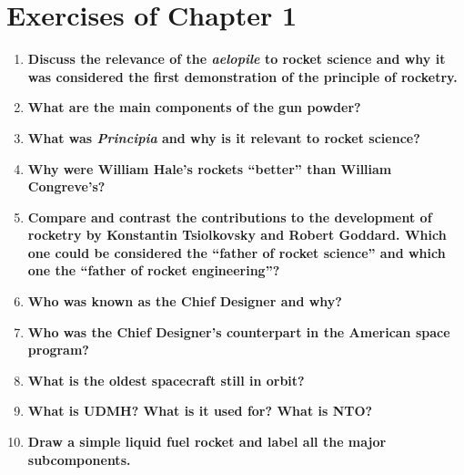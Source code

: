 \section{Exercises of Chapter 1}

\begin{enumerate}
	\item {\bf Discuss the relevance of the \textit{aelopile} to rocket science and why it was considered the first demonstration of the principle of rocketry.}\\

	\item {\bf What are the main components of the gun powder?}\\
	
	\item {\bf What was \textit{Principia} and why is it relevant to rocket science?}\\
	
	\item {\bf Why were William Hale’s rockets “better” than William Congreve’s?}\\
	
	\item {\bf Compare and contrast the contributions to the development of rocketry by Konstantin Tsiolkovsky and Robert Goddard. Which one could be considered the “father of rocket science” and which one the “father of rocket engineering”?}\\
	
	\item {\bf Who was known as the Chief Designer and why?}\\
	
	\item {\bf Who was the Chief Designer’s counterpart in the American space program?}\\
	
	\item {\bf What is the oldest spacecraft still in orbit?}\\
	
	\item {\bf What is UDMH? What is it used for? What is NTO?}\\
	
	\item {\bf Draw a simple liquid fuel rocket and label all the major subcomponents.}\\
	
\end{enumerate}